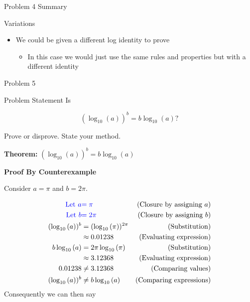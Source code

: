 \begin{summary}{Problem 4 Summary}
    \begin{statement}{Variations}
        \begin{itemize}
            \item We could be given a different log identity to prove
            \begin{itemize}
                \item In this case we would just use the same rules and properties but with a different identity
            \end{itemize}
        \end{itemize}
    \end{statement}
\end{summary}

\begin{problem}{Problem 5}
    \begin{statement}{Problem Statement}
        Is 

        \begin{equation*}
            (\log_{10}(a))^{b} = b \log_{10}{(a)}?
        \end{equation*}

        Prove or disprove. State your method.
    \end{statement}

    \begin{Highlight}[Solution]
        \textbf{Theorem:} $(\log_{10}(a))^{b} = b \log_{10}{(a)}$ \vspace*{1em}

        \textbf{Proof By Counterexample} \vspace*{1em}

        Consider $a = \pi$ and $b = 2\pi$.

        \begin{align*}
            \textcolor{blue}{\text{Let } a } & \textcolor{blue}{ = \pi} & \text{(Closure by assigning $a$)} \\
            \textcolor{blue}{\text{Let } b } & \textcolor{blue}{ = 2\pi} & \text{(Closure by assigning $b$)} \\
            (\log_{10}{(a)})^{b} & = (\log_{10}{(\pi)})^{2\pi} & \text{(Substitution)} \\
            & \approx 0.01238 & \text{(Evaluating expression)} \\
            b\log_{10}{(a)} & = 2\pi\log_{10}{(\pi)} & \text{(Substitution)} \\
            & \approx 3.12368 & \text{(Evaluating expression)} \\
            0.01238 & \neq 3.12368 & \text{(Comparing values)} \\
            (\log_{10}{(a)})^{b} & \neq b\log_{10}{(a)} & \text{(Comparing expressions)}
        \end{align*}
        Consequently we can then say 


\end{Highlight}
\end{problem}
